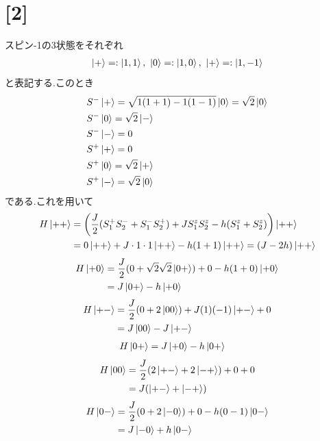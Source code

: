 \documentclass[uplatex,a4j,11pt,dvipdfmx]{jsarticle}
\newcommand{\Hheis}{\left(\frac{J}{2}(S_1^+S_2^-+S_1^-S_2^+)+JS_1^zS_2^z-h(S_1^z+S_2^z)\right)}
\begin{document}
\section*{[2]}
スピン-1の3状態をそれぞれ
\begin{align}
  \Ket{+}=:\Ket{1,1},\ 
  \Ket{0}=:\Ket{1,0},\ 
  \Ket{+}=:\Ket{1,-1}
\end{align}
と表記する.このとき
\begin{align}
  \begin{split}
    &S^-\Ket{+}=\sqrt{1(1+1)-1(1-1)}\Ket{0}=\sqrt{2}\Ket{0}\\
    &S^-\Ket{0}=\sqrt{2}\Ket{-}\\
    &S^-\Ket{-}=0\\
    &S^+\Ket{+}=0\\
    &S^+\Ket{0}=\sqrt{2}\Ket{+}\\
    &S^+\Ket{-}=\sqrt{2}\Ket{0}
  \end{split}
\end{align}
である.これを用いて
\begin{align}
  \begin{split}
    H\Ket{++}&=\Hheis\Ket{++}\\
    &=0\Ket{++}+J\cdot1\cdot1\Ket{++}-h(1+1)\Ket{++}=(J-2h)\Ket{++}
  \end{split}
\end{align}
\begin{align}
  \begin{split}
    H\Ket{+0}&=\frac{J}{2}(0+\sqrt{2}\sqrt{2}\Ket{0+})+0-h(1+0)\Ket{+0}\\
    &=J\Ket{0+}-h\Ket{+0}
  \end{split}
\end{align}
\begin{align}
  \begin{split}
    H\Ket{+-}&=\frac{J}{2}(0+2\Ket{00})+J(1)(-1)\Ket{+-}+0\\
    &=J\Ket{00}-J\Ket{+-}
  \end{split}
\end{align}
\begin{align}
    H\Ket{0+}&=J\Ket{+0}-h\Ket{0+}
\end{align}
\begin{align}
  \begin{split}
    H\Ket{00}&=\frac{J}{2}(2\Ket{+-}+2\Ket{-+})+0+0\\
    &=J(\Ket{+-}+\Ket{-+})
  \end{split}
\end{align}
\begin{align}
  \begin{split}
    H\Ket{0-}&=\frac{J}{2}(0+2\Ket{-0})+0-h(0-1)\Ket{0-}\\
    &=J\Ket{-0}+h\Ket{0-}
  \end{split}
\end{align}
\end{document}
